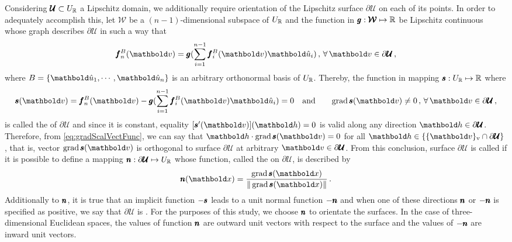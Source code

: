 Considering $\pmb{\mathcal{U}}\subset U_{\mathbb{R}}$ a Lipschitz domain, we additionally require orientation of the Lipschitz surface $\partial\pmb{\mathcal{U}}$ on each of its points. In order to adequately accomplish this, let $\pmb{\mathcal{W}}$ be a $(n-1)$-dimensional subspace of $U_{\mathbb{R}}$ and the function in $\pmb{g} : \pmb{\mathcal{W}} \mapsto \mathbb{R}$ be Lipschitz continuous whose graph describes $\partial\pmb{\mathcal{U}}$ in such a way that
\begin{equation*}
\fua{\vtf{f}_n^B}{\vto{v}} = \fua{\vtf{g}}{\sum_{i=1}^{n-1}\fua{\vtf{f}_i^B}{\vto{v}}\vun{u}_i}\,,\,\forall\,\vto{v}\in\partial\pmb{\mathcal{U}}\,,
\end{equation*}
where $B=\{\vun{u}_1,\cdots,\vun{u}_n\}$ is an arbitrary orthonormal basis of $U_{\mathbb{R}}$. Thereby, the function in mapping $\pmb{s} : U_{\mathbb{R}} \mapsto \mathbb{R}$ where
\begin{alignat}{3}\label{eq:impliSurf}
\fua{\vtf{s}}{\vto{v}} = \fua{\vtf{f}_n^B}{\vto{v}} - \fua{\vtf{g}}{\sum_{i=1}^{n-1}\fua{\vtf{f}_i^B}{\vto{v}}\vun{u}_i}=0& \quad\text{and} \quad &\fua{\grad{\vtf{s}}}{\vto{v}}\neq 0\,,\,\forall\,\vto{v}\in\partial\pmb{\mathcal{U}}\,,
\end{alignat}
is called the  of $\partial\pmb{\mathcal{U}}$ and since it is constant, equality $[\fua{\vtf{s}'}{\vto{v}}](\vto{h})=0$ is valid along any direction $\vto{h}\in\partial\pmb{\mathcal{U}}$. Therefore,  from \eqref{eq:gradScalVectFunc}, we can say that $\vto{h}\cdot\fua{\grad{\vtf{s}}}{\vto{v}}=0$ for all $\vto{h}\in\{\viz{\vto{v}}\cap\partial\pmb{\mathcal{U}}\}$, that is, vector $\fua{\grad{\vtf{s}}}{\vto{v}}$ is orthogonal to surface $\partial\pmb{\mathcal{U}}$ at arbitrary $\vto{v}\in\partial\pmb{\mathcal{U}}$. From this conclusion, surface $\partial\pmb{\mathcal{U}}$ is called  if it is possible to define a mapping $\pmb{n} : \partial\pmb{\mathcal{U}} \mapsto U_{\mathbb{R}}$ whose function, called the  on $\partial\pmb{\mathcal{U}}$, is described by
\begin{equation}
\fua{\vtf{n}}{\vto{x}}=\dfrac{\fua{\grad{\vtf{s}}}{\vto{x}}}{\|\fua{\grad{\vtf{s}}}{\vto{x}}\|}\,.
\end{equation}
Additionally to $\pmb{n}$, it is true that an implicit function $-\pmb{s}$ leads to a unit normal function $-\pmb{n}$ and when one of these directions $\pmb{n}$ or $-\pmb{n}$ is specified as positive, we say that $\partial\pmb{\mathcal{U}}$ is . For the purposes of this study, we choose $\pmb{n}$ to orientate the surfaces. In the case of three-dimensional Euclidean spaces, the values of function $\pmb{n}$ are outward unit vectors with respect to the surface and the values of $-\pmb{n}$ are inward unit vectors.

